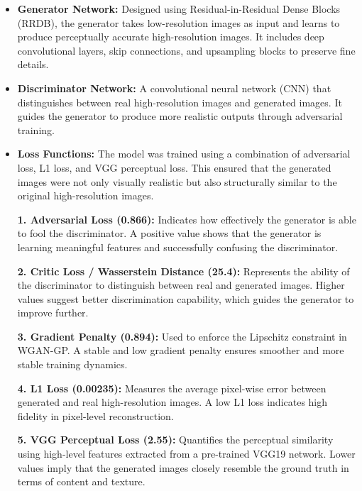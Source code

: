 \begin{itemize}
    \item \textbf{Generator Network:} Designed using Residual-in-Residual Dense Blocks (RRDB), the generator takes low-resolution images as input and learns to produce perceptually accurate high-resolution images. It includes deep convolutional layers, skip connections, and upsampling blocks to preserve fine details.
    
    \item \textbf{Discriminator Network:} A convolutional neural network (CNN) that distinguishes between real high-resolution images and generated images. It guides the generator to produce more realistic outputs through adversarial training.
    
    \item \textbf{Loss Functions:} The model was trained using a combination of adversarial loss, L1 loss, and VGG perceptual loss. This ensured that the generated images were not only visually realistic but also structurally similar to the original high-resolution images.

    \textbf{1. Adversarial Loss (0.866):} Indicates how effectively the generator is able to fool the discriminator. A positive value shows that the generator is learning meaningful features and successfully confusing the discriminator.

\textbf{2. Critic Loss / Wasserstein Distance (25.4):} Represents the ability of the discriminator to distinguish between real and generated images. Higher values suggest better discrimination capability, which guides the generator to improve further.

\textbf{3. Gradient Penalty (0.894):} Used to enforce the Lipschitz constraint in WGAN-GP. A stable and low gradient penalty ensures smoother and more stable training dynamics.

\textbf{4. L1 Loss (0.00235): }Measures the average pixel-wise error between generated and real high-resolution images. A low L1 loss indicates high fidelity in pixel-level reconstruction.

\textbf{5. VGG Perceptual Loss (2.55):} Quantifies the perceptual similarity using high-level features extracted from a pre-trained VGG19 network. Lower values imply that the generated images closely resemble the ground truth in terms of content and texture.
\vspace{0.5cm}
\end{itemize}



